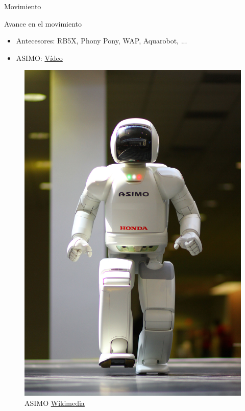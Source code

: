 \begin{frame}[fragile]{Movimiento}
\vspace{10px}
\pause
{}
\begin{block}{Avance en el movimiento}
	\begin{itemize}
		\item Antecesores: RB5X, Phony Pony, WAP, Aquarobot, ...
		\pause
		\item ASIMO: \href{https://www.youtube.com/watch?v=mI58DU1hu14}{Vídeo}
	\end{itemize}
\end{block}
\begin{figure}
	\centering
	\pause
	\includegraphics[scale=0.12]{./EtapaModerna/Imagenes/asimo.jpg}
	\caption{ASIMO \href{https://es.m.wikipedia.org/wiki/Archivo:ASIMO_4.28.11.jpg}{Wikimedia}}
\end{figure}
\end{frame}

